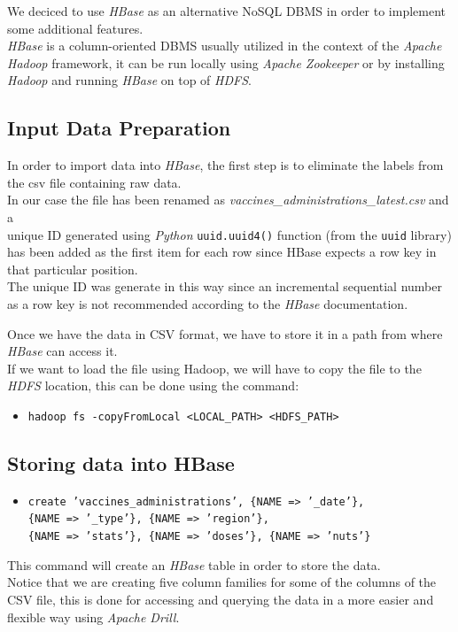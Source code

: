 \documentclass[12pt, a4paper]{article}
\begin{document}
We deciced to use \emph{HBase} as an alternative NoSQL DBMS in order to implement some 
additional features. \\
\emph{HBase} is a column-oriented DBMS usually utilized in the context of the 
\emph{Apache Hadoop} framework, it can be run locally using \emph{Apache Zookeeper} or 
by installing \emph{Hadoop} and running \emph{HBase} on top of \emph{HDFS}.

\subsection{Input Data Preparation}

In order to import data into \emph{HBase}, the first step is to eliminate the labels 
from the csv file containing raw data. \\
In our case the file has been renamed as \emph{vaccines\_administrations\_latest.csv} 
and a \\ unique ID generated using \emph{Python} \texttt{uuid.uuid4()} function 
(from the \texttt{uuid} library) has been added as the first item for each row since
HBase expects a row key in that particular position. \\ 
The unique ID was generate in this way since an incremental sequential number as a 
row key is not recommended according to the \emph{HBase} documentation. 

\noindent
Once we have the data in CSV format, we have to store it in a path from where 
\emph{HBase} can access it. \\
If we want to load the file using Hadoop, we will have to copy the file to the 
\emph{HDFS} location, this can be done using the command:
\begin{footnotesize}
  \begin{itemize}
    \item[] \texttt{hadoop fs -copyFromLocal <LOCAL\_PATH>  <HDFS\_PATH>} 
  \end{itemize}
\end{footnotesize}

\subsection{Storing data into HBase}

\begin{footnotesize}
  \begin{itemize}
    \item[] \texttt{create 'vaccines\_administrations', \{NAME => '\_date'\}, \\
      \{NAME => '\_type'\}, \{NAME => 'region'\}, \\
      \{NAME => 'stats'\}, \{NAME => 'doses'\}, \{NAME => 'nuts'\}} 
  \end{itemize}
\end{footnotesize}
This command will create an \emph{HBase} table in order to store the data. \\
Notice that we are creating five column families for some of the columns of the CSV file,
this is done for accessing and querying the data in a more easier and flexible way using
\emph{Apache Drill}. 
\end{document}
